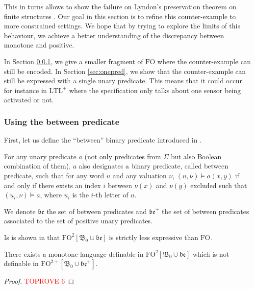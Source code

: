 \documentclass[a4paper,UKenglish,cleveref, autoref, thm-restate]{lipics-v2021}
\newcommand{\FO}{\mathrm{FO}}
\newcommand{\FOtw}{\FO^2}
\newcommand{\FOtwp}{\FO^{2+}}
\newcommand{\LTL}{\mathrm{LTL}}
\newcommand{\LTLp}{\LTL^+}
\newcommand{\be}{\mathfrak{be}}
\newcommand{\val}{\nu}
\newcommand{\bin}{\mathfrak{B}}
\begin{document}
This in turns allows to show the failure on Lyndon's preservation theorem on finite structures \cite{PFO}.
Our goal in this section is to refine this counter-example to more constrained settings. We hope that by trying to explore the limits of this behaviour, we achieve a better understanding of the discrepancy between monotone and positive.

In Section \ref{sec:between}, we give a smaller fragment of $\FO$ where the counter-example can still be encoded.
In Section \ref{sec:onepred}, we show that the counter-example can still be expressed with a single unary predicate. This means that it could occur for instance in $\LTLp$ where the specification only talks about one sensor being activated or not.

\subsubsection{Using the between predicate}\label{sec:between}

First, let us define the ``between'' binary predicate introduced in \cite{between}.

\begin{definition}\cite{between}
    For any unary predicate $a$ (not only predicates from $\Sigma$ but also Boolean combination of them), $a$ also designates a binary predicate, called between predicate, such that for any word $u$ and any valuation $\val$, $(u,\val) \models a(x,y)$ if and only if there exists an index $i$ between $\val(x)$ and $\val(y)$ excluded such that $(u_i,\val) \models a$, where $u_i$ is the $i$-th letter of $u$.

    We denote $\be$ the set of between predicates and $\be^+$ the set of between predicates associated to the set of positive unary predicates.
\end{definition}

Is is shown in \cite{between} that $\FO^2[\bin_0\cup\be]$ is strictly less expressive than $\FO$.

\begin{proposition} \label{FO2be}
    There exists a monotone language definable in $\FOtw[\bin_0 \cup \be]$ which is not definable in $\FOtwp[\bin_0 \cup \be^+]$.
\end{proposition}




\begin{proof}\textcolor{red}{TOPROVE 6}\end{proof}
\end{document}
